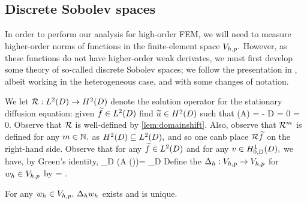 \subsection{Discrete Sobolev spaces}\label{sec:discsob}
In order to perform our analysis for high-order FEM, we will need to measure higher-order norms of functions in the finite-element space $V_{h,p}.$ However, as these functions do not have higher-order weak derivates, we must first develop some theory of so-called discrete Sobolev spaces; we follow the presentation in \cite{DuWu:15}, albeit working in the heterogeneous case, and with some changes of notation.

We let $\DeltaAI:\LtD\rightarrow\HtD$ denote the solution operator for the stationary diffusion equation: given $\ftilde \in \LtD$ find $\utilde \in \HtD$ such that
\beq\label{eq:sdeq}
\grad \cdot \mleft(A\grad \utilde\mright) = -\ftilde {} D
\eeq
\beq\label{eq:sddbc}
\trD \utilde = 0
\eeq
\beq\label{eq:sdnbc}
\dn \utilde = 0.
\eeq
Observe that $\mathcal R$ is well-defined by \cref{lem:domainshift}. Also, observe that $\mathcal R^{m}$ is defined for any $m \in \mathbb N,$ as $\HtD \subseteq \LtD,$ and so one canb place $\mathcal R \widetilde{f}$ on the right-hand side. 
Observe that for any $\ftilde \in \LtD$ and for any $v \in \HozDD,$ we have, by Green's identity,
\beqs\label{eq:deltaagreen}
\int_D \mleft(A \grad \mleft(\DeltaAI\ftilde\mright)\mright)\cdot \grad \vb = \int_D \ftilde \vb
\eeqs
{}
Define the  $\Delta_{h}:V_{h,p}\rightarrow V_{h,p}$ for $w_{h} \in V_{h,p}$ by
\beq\label{eq:discderdef}
\IPLtD{\Deltah \wh}{\vh} =  \tforall \vh \in \Vhp.
\eeq
\ede

\label{lem:ddwd}
For any $w_{h} \in V_{h,p},$ $\Delta_{h} w_{h}$ exists and is unique.
\ele

